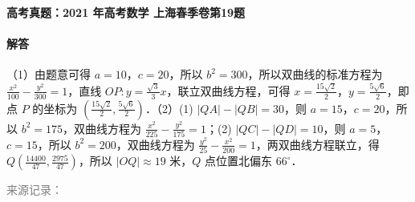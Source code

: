 \documentclass[UTF8,a4paper,11pt]{ctexart}
\newenvironment{gaokao}[1]{\par\medskip\noindent\textbf{高考真题：#1}\par\smallskip}{\par\medskip}
\begin{document}
\begin{gaokao}{2021 年高考数学 上海春季卷第19题}
\paragraph{解答}

（1）由题意可得 $a=10$，$c=20$，所以 $b^2=300$，所以双曲线的标准方程为 $\frac{x^2}{100}-\frac{y^2}{300}=1$，直线 $OP:y=\frac{\sqrt{3}}{3}x$，联立双曲线方程，可得 $x=\frac{15\sqrt{2}}{2}$，$y=\frac{5\sqrt{6}}{2}$，即点 $P$ 的坐标为 $(\frac{15\sqrt{2}}{2},\frac{5\sqrt{6}}{2})$．\newline（2）(1) $|QA|-|QB|=30$，则 $a=15$，$c=20$，所以 $b^2=175$，双曲线方程为 $\frac{x^2}{225}-\frac{y^2}{175}=1$；(2) $|QC|-|QD|=10$，则 $a=5$，$c=15$，所以 $b^2=200$，双曲线方程为 $\frac{y^2}{25}-\frac{x^2}{200}=1$，两双曲线方程联立，得 $Q(\frac{14400}{47},\frac{2975}{47})$，所以 $|OQ|\approx 19$ 米，$Q$ 点位置北偏东 $66^\circ$．

\par\smallskip\textcolor{gray}{\footnotesize 来源记录：\texttt{}}

\end{gaokao}
\end{document}
